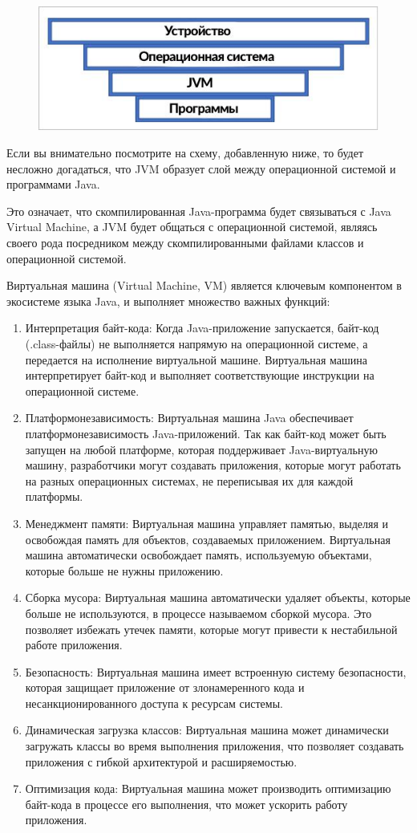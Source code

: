 \begin{figure}[h!]\center
  \includegraphics[width=0.8\linewidth]{images/pic1-2.jpg}
\end{figure}

Если вы внимательно посмотрите на схему, добавленную ниже, то будет несложно догадаться, что JVM образует слой между операционной системой и программами Java.

Это означает, что скомпилированная Java-программа будет связываться с Java Virtual Machine, а JVM будет общаться с операционной системой, являясь своего рода посредником между скомпилированными файлами классов и операционной системой.

Виртуальная машина (Virtual Machine, VM) является ключевым компонентом в экосистеме языка Java, и выполняет множество важных функций:
\begin{enumerate}
\item Интерпретация байт-кода: Когда Java-приложение запускается, байт-код (.class-файлы) не выполняется напрямую на операционной системе, а передается на исполнение виртуальной машине. Виртуальная машина интерпретирует байт-код и выполняет соответствующие инструкции на операционной системе.
\item Платформонезависимость: Виртуальная машина Java обеспечивает платформонезависимость Java-приложений. Так как байт-код может быть запущен на любой платформе, которая поддерживает Java-виртуальную машину, разработчики могут создавать приложения, которые могут работать на разных операционных системах, не переписывая их для каждой платформы.
\item Менеджмент памяти: Виртуальная машина управляет памятью, выделяя и освобождая память для объектов, создаваемых приложением. Виртуальная машина автоматически освобождает память, используемую объектами, которые больше не нужны приложению.
\item Сборка мусора: Виртуальная машина автоматически удаляет объекты, которые больше не используются, в процессе называемом сборкой мусора. Это позволяет избежать утечек памяти, которые могут привести к нестабильной работе приложения.
\item Безопасность: Виртуальная машина имеет встроенную систему безопасности, которая защищает приложение от злонамеренного кода и несанкционированного доступа к ресурсам системы.
\item Динамическая загрузка классов: Виртуальная машина может динамически загружать классы во время выполнения приложения, что позволяет создавать приложения с гибкой архитектурой и расширяемостью.
\item Оптимизация кода: Виртуальная машина может производить оптимизацию байт-кода в процессе его выполнения, что может ускорить работу приложения.
\end{enumerate}

